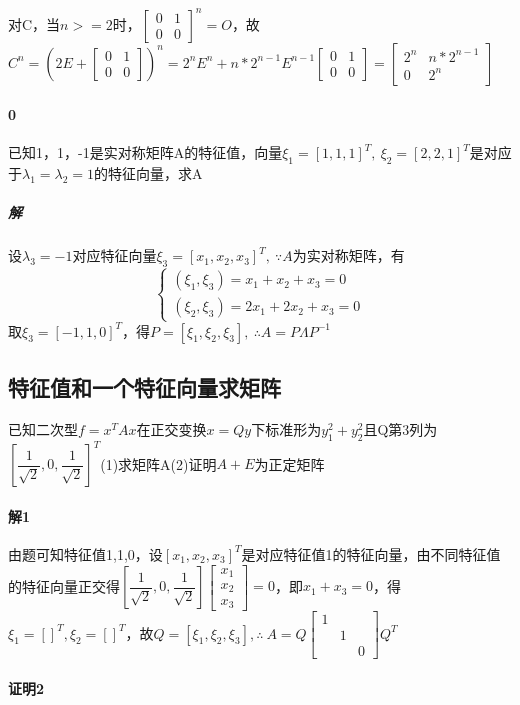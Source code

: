 对C，当\(n >= 2\)时，\(\begin{bmatrix}
    0 & 1 \\ 
    0 & 0
\end{bmatrix}^n = O\)，故\(C^n = (2E + \begin{bmatrix}
    0 & 1 \\ 
    0 & 0
\end{bmatrix})^n = 2^nE^n + n * 2^{n - 1}E^{n - 1}\begin{bmatrix}
    0 & 1 \\ 
    0 & 0
\end{bmatrix} = \begin{bmatrix}
    2^n & n * 2^{n - 1} \\ 
    0 & 2^n
\end{bmatrix}\)

\paragraph{0}
已知1，1，-1是实对称矩阵A的特征值，向量\(\xi_1 = [1, 1, 1]^T,\ \xi_2 = [2, 2, 1]^T\)是对应于\(\lambda_1 = \lambda_2 = 1\)的特征向量，求A
\subparagraph{解}
设\(\lambda_3 = -1\)对应特征向量\(\xi_3 = [x_1, x_2, x_3]^T,\ \because A\)为实对称矩阵，有\[\begin{cases}
    (\xi_1, \xi_3) = x_1 + x_2 + x_3 = 0 \\ 
    (\xi_2, \xi_3) = 2x_1 + 2x_2 + x_3 = 0
\end{cases}\]
取\(\xi_3 = [-1, 1, 0]^T\)，得\(P = [\xi_1, \xi_2, \xi_3],\ \therefore A = P\Lambda P^{-1}\)

\subsection{特征值和一个特征向量求矩阵}
已知二次型\(f = x^TAx\)在正交变换\(x = Qy\)下标准形为\(y_1^2 + y_2^2\)且Q第3列为\([\dfrac{1}{\sqrt{2}}, 0, \dfrac{1}{\sqrt{2}}]^T\)(1)求矩阵A(2)证明\(A + E\)为正定矩阵

\paragraph{解1}
由题可知特征值1,1,0，设\([x_1, x_2, x_3]^T\)是对应特征值1的特征向量，由不同特征值的特征向量正交得\([\dfrac{1}{\sqrt{2}}, 0, \dfrac{1}{\sqrt{2}}]\begin{bmatrix}
    x_1 \\ 
    x_2 \\ 
    x_3
\end{bmatrix} = 0\)，即\(x_1 + x_3 = 0\)，得\(\xi_1 = []^T, \xi_2 = []^T\)，故\(Q = [\xi_1, \xi_2, \xi_3], \therefore\ A = Q\begin{bmatrix}
    1 \\ 
    & 1 \\ 
    & & 0
\end{bmatrix}Q^T\)

\paragraph{证明2}


